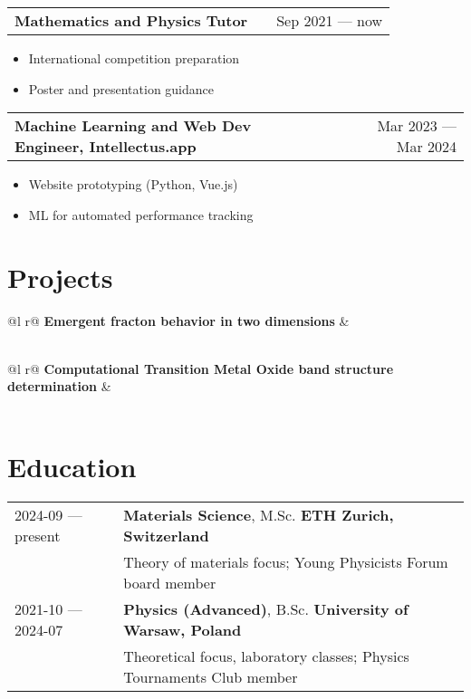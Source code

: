 \documentclass[a4paper,10pt]{article}
\makeatletter
\newenvironment{joblong}[2]
    {
    \begin{tabularx}{\linewidth}{@{}l X r@{}}
    \textbf{#1} & \hfill &  #2 \\[3.75pt]
    \end{tabularx}
    \begin{minipage}[t]{\linewidth}
    \begin{itemize}[nosep,after=\strut, leftmargin=1em, itemsep=3pt,label=--]
    }
    {
    \end{itemize}
    \end{minipage}    
    }
\makeatother
\begin{document}
\begin{joblong}{Mathematics and Physics Tutor}{Sep 2021 --- now}
    \item International competition preparation
    \item Poster and presentation guidance
\end{joblong}

\begin{joblong}{Machine Learning and Web Dev Engineer, Intellectus.app}{Mar 2023 --- Mar 2024}
    \item Website prototyping (Python, Vue.js)
    \item ML for automated performance tracking
\end{joblong}
  
\section{Projects}

\begin{tabularx}{\linewidth}{ @{}l r@{} }%
\textbf{Emergent fracton behavior in two dimensions} & \hfill \\[3.75pt]
  \\
\end{tabularx}

\begin{tabularx}{\linewidth}{ @{}l r@{} }%
\textbf{Computational Transition Metal Oxide band structure determination} & \hfill \\[3.75pt]
  \\
\end{tabularx}

\section{Education}
\begin{tabularx}{\linewidth}{@{}l X@{}}	
2024-09 --- present & \textbf{Materials Science}, M.Sc. \hfill \textbf{ETH Zurich, Switzerland} \\[3.75pt]
& Theory of materials focus; Young Physicists Forum board member \\[6pt]

2021-10 --- 2024-07 & \textbf{Physics (Advanced)}, B.Sc. \hfill \textbf{University of Warsaw, Poland} \\[3.75pt]
& Theoretical focus, laboratory classes; Physics Tournaments Club member \\[6pt]

\end{tabularx}
\end{document}
